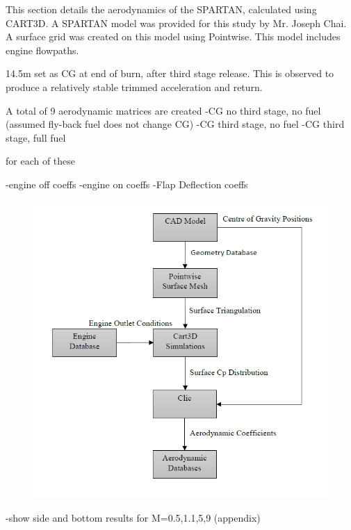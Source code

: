 This section details the aerodynamics of the SPARTAN, calculated using CART3D. A SPARTAN model was provided for this study by Mr. Joseph Chai. A surface grid was created on this model using Pointwise\cite{Pointwise}. This model includes engine flowpaths. 






14.5m set as CG at end of burn, after third stage release. This is observed to produce a relatively stable trimmed acceleration and return. 

A total of 9 aerodynamic matrices are created
-CG no third stage, no fuel (assumed fly-back fuel does not change CG)
-CG third stage, no fuel
-CG third stage, full fuel

for each of these

-engine off coeffs
-engine on coeffs
-Flap Deflection coeffs


\begin{figure}
\centering
\includegraphics[width=0.7\linewidth]{figures/3_vehicle_design/FlowChart}
\caption{}
\label{fig:FlowChart}
\end{figure}


-show side and bottom results for M=0.5,1.1,5,9 (appendix)

